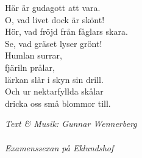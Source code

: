 \vspace{10pt}
Här är gudagott att vara.\\
O, vad livet dock är skönt!\\
Hör, vad fröjd från fåglars skara.\\
Se, vad gräset lyser grönt!\\
Humlan surrar,\\
fjäriln prålar,\\
lärkan slår i skyn sin drill.\\
Och ur nektarfyllda skålar\\
dricka oss små blommor till.\par
\vspace{10pt}
  {\footnotesize\textit{Text \& Musik: Gunnar Wennerberg\\
      \\
      Examenssexan på Eklundshof}}
